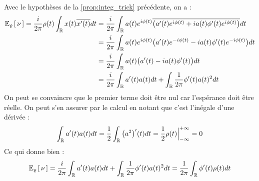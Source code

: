 \begin{annexe}
\begin{demo}
	Avec le hypothèses de la \cref{prop:integ_trick} précédente, on a :
	\begin{align*}
		\mathbb{E}_{\varrho}\left[\, \nu\, \right] = \frac{i}{2\pi} \rho(t) \int_{\mathbb{R}} x(t) \overline{x'(t)} dt &= \frac{i}{2\pi}\int_{\mathbb{R}} a(t)e^{i\phi(t)}\overline{\big( a'(t)e^{i\phi(t)}+ ia(t)\phi'(t)e^{i\phi(t)} \big)} dt \\
		&= \frac{i}{2\pi}\int_{\mathbb{R}} a(t)e^{i\phi(t)}\big( a'(t)e^{-i\phi(t)} -ia(t)\phi'(t)e^{-i\phi(t)} \big) dt \\
		&= \frac{i}{2\pi}\int_{\mathbb{R}} a(t)\big( a'(t)- ia(t)\phi'(t)\big) dt \\
		&= \frac{i}{2\pi}\int_{\mathbb{R}} a'(t)a(t) dt + \int_{\mathbb{R}}  \frac{1}{2\pi}\phi'(t)a(t)^2 dt \\
	\end{align*}
	On peut se convaincre que le premier terme doit être nul car l'espérance doit être réelle. On peut s'en assurer par le calcul en notant que c'est l’inégale d'une dérivée :
	\[\int_{\mathbb{R}} a'(t)a(t) dt = \frac{1}{2} \int_{\mathbb{R}} \big(a^2\big)'(t) dt = \frac{1}{2}\rho(t)\Big|_{-\infty}^{+\infty} = 0\]
	Ce qui donne bien :
	\[\mathbb{E}_{\varrho}\left[\, \nu\, \right] = \frac{i}{2\pi}\int_{\mathbb{R}} a'(t)a(t) dt + \int_{\mathbb{R}}  \frac{1}{2\pi}\phi'(t)a(t)^2 dt = \frac{1}{2\pi}\int_{\mathbb{R}} \phi'(t)\rho(t) dt\]
\end{demo}



\end{annexe}
